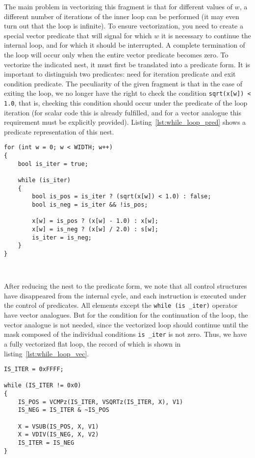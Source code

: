 \documentclass[
11pt,%
tightenlines,%
twoside,%
onecolumn,%
nofloats,%
nobibnotes,%
nofootinbib,%
superscriptaddress,%
noshowpacs,%
centertags]%
{revtex4}
\begin{document}
The main problem in vectorizing this fragment is that for different values of $ w $, a different number of iterations of the inner loop can be performed (it may even turn out that the loop is infinite).
To ensure vectorization, you need to create a special vector predicate that will signal for which $w$ it is necessary to continue the internal loop, and for which it should be interrupted.
A complete termination of the loop will occur only when the entire vector predicate becomes zero.
To vectorize the indicated nest, it must first be translated into a predicate form.
It is important to distinguish two predicates: need for iteration predicate and exit condition predicate.
The peculiarity of the given fragment is that in the case of exiting the loop, we no longer have the right to check the condition \texttt{sqrt(x[w]) < 1.0}, that is, checking this condition should occur under the predicate of the loop iteration (for scalar code this is already fulfilled, and for a vector analogue this requirement must be explicitly provided).
Listing~\ref{lst:while_loop_pred} shows a predicate representation of this nest.

\begin{lstlisting}[caption={The predicate form of a flat loop containing a loop with a non-constant number of iterations},label={lst:while_loop_pred}]
for (int w = 0; w < WIDTH; w++)
{
    bool is_iter = true;

    while (is_iter)
    {
        bool is_pos = is_iter ? (sqrt(x[w]) < 1.0) : false;
        bool is_neg = is_iter && !is_pos;    
    
        x[w] = is_pos ? (x[w] - 1.0) : x[w];
        x[w] = is_neg ? (x[w] / 2.0) : s[w];
        is_iter = is_neg;
    }
}
\end{lstlisting}

\

After reducing the nest to the predicate form, we note that all control structures have disappeared from the internal cycle, and each instruction is executed under the control of predicates.
All elements except the \texttt{while (is \_iter)} operator have vector analogues.
But for the condition for the continuation of the loop, the vector analogue is not needed, since the vectorized loop should continue until the mask composed of the individual conditions \texttt{is \_iter} is not zero.
Thus, we have a fully vectorized flat loop, the record of which is shown in listing~\ref{lst:while_loop_vec}.

\begin{lstlisting}[caption={The vector form of a flat loop containing a loop with a non-constant number of iterations},label={lst:while_loop_vec}]
IS_ITER = 0xFFFF;

while (IS_ITER != 0x0)
{
    IS_POS = VCMPz(IS_ITER, VSQRTz(IS_ITER, X), V1)
    IS_NEG = IS_ITER & ~IS_POS
    
    X = VSUB(IS_POS, X, V1)
    X = VDIV(IS_NEG, X, V2)
    IS_ITER = IS_NEG
}
\end{lstlisting}
\end{document}
